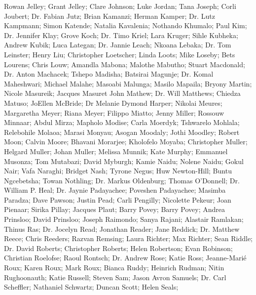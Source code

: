     Rowan Jelley;
    Grant Jelley;
    Clare Johnson;
    Luke Jordan;
    Tana Joseph;
    Corli Joubert;
Dr. Fabian Jutz;
    Brian Kamanzi;
    Herman Kamper;
Dr. Lutz Kampmann;
    Simon Katende;
    Natalia Kavalenia;
    Nothando Khumalo;
    Paul Kim;
Dr. Jennifer Klay;
    Grove Koch;
Dr. Timo Kriel;
    Lara Kruger;
    Sihle Kubheka;
    Andrew Kubik;
    Luca Lategan;
Dr. Jannie Leach;
    Nkoana Lebaka;
Dr. Tom Leinster;
    Henry Liu;
    Christopher Loetscher;
    Linda Loots;
    Mike Loseby;
    Bets Lourens;
    Chris Louw;
    Amandla Mabona;
    Malothe Mabutho;
    Stuart Macdonald;
Dr. Anton Machacek;
    Tshepo Madisha;
    Batsirai Magunje;
Dr. Komal Maheshwari;
    Michael Malahe;
    Masoabi Malunga;
    Masilo Mapaila;
    Bryony Martin;
    Nicole Masureik;
    Jacques Masuret
    John Mathew;
Dr. Will Matthews;
    Chiedza Matuso;
    JoEllen McBride;
    Dr Melanie Dymond Harper;
    Nikolai Meures;
    Margaretha Meyer;
    Riana Meyer;
    Filippo Miatto;
    Jenny Miller;
    Rossouw Minnaar;
    Abdul Mirza;
    Mapholo Modise;
    Carla Moerdyk;
    Tshwarelo Mohlala;
    Relebohile Molaoa;
    Marasi Monyau;
    Asogan Moodaly;
    Jothi Moodley;
    Robert Moon;
    Calvin Moore;
    Bhavani Morarjee;
    Kholofelo Moyaba;
    Christopher Muller;
    Helgard Muller;
    Johan Muller;
    Melissa Munnik;
    Kate Murphy;
    Emmanuel Musonza;
    Tom Mutabazi;
    David Myburgh;
    Kamie Naidu;
    Nolene Naidu;
    Gokul Nair;
    Vafa Naraghi;
    Bridget Nash;
    Tyrone Negus;
    Huw Newton-Hill;
    Buntu Ngcebetsha;
    Towan Nothling;
Dr. Markus Oldenburg;
    Thomas O’Donnell;
Dr. William P. Heal;
Dr. Jaynie Padayachee;
    Poveshen Padayachee;
    Masimba Paradza;
    Dave Pawson;
    Justin Pead;
    Carli Pengilly;
    Nicolette Pekeur;
    Joan Pienaar;
    Sirika Pillay;
    Jacques Plaut;
    Barry Povey;
    Barry Povey;
    Andrea Prinsloo;
    David Prinsloo;
    Joseph Raimondo;
    Sanya Rajani;
    Alastair Ramlakan;
    Thinus Ras;
Dr. Jocelyn Read;
    Jonathan Reader;
    Jane Reddick;
Dr. Matthew Reece;
    Chris Reeders;
    Razvan Remsing;
    Laura Richter;
    Max Richter;
    Sean Riddle;
Dr. David Roberts;
    Christopher Roberts;
    Helen Robertson;
    Evan Robinson;
    Christian Roelofse;
    Raoul Rontsch;
Dr. Andrew Rose;
    Katie Ross;
    Jeanne-Marié Roux;
    Karen Roux;
    Mark Roux;
    Bianca Ruddy;
    Heinrich Rudman;
    Nitin Rughoonauth;
    Katie Russell;
    Steven Sam;
    Jason Avron Samuels;
Dr. Carl Scheffler;
    Nathaniel Schwartz;
    Duncan Scott;
    Helen Seals;
